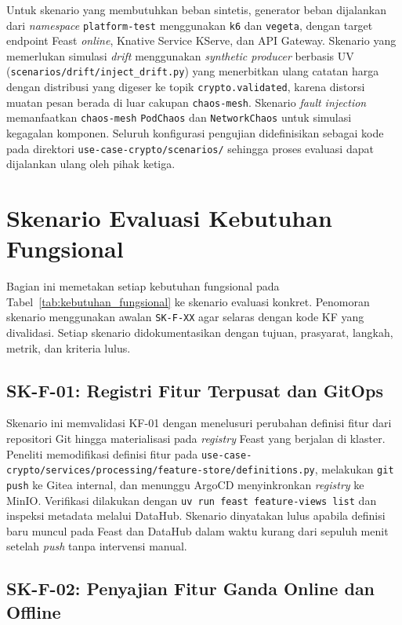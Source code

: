 Untuk skenario yang membutuhkan beban sintetis, generator beban dijalankan dari \textit{namespace} \texttt{platform-test} menggunakan \texttt{k6} dan \texttt{vegeta}, dengan target endpoint Feast \textit{online}, Knative Service KServe, dan API Gateway. Skenario yang memerlukan simulasi \textit{drift} menggunakan \textit{synthetic producer} berbasis UV (\texttt{scenarios/drift/inject\_drift.py}) yang menerbitkan ulang catatan harga dengan distribusi yang digeser ke topik \texttt{crypto.validated}, karena distorsi muatan pesan berada di luar cakupan \texttt{chaos-mesh}. Skenario \textit{fault injection} memanfaatkan \texttt{chaos-mesh} \texttt{PodChaos} dan \texttt{NetworkChaos} untuk simulasi kegagalan komponen. Seluruh konfigurasi pengujian didefinisikan sebagai kode pada direktori \texttt{use-case-crypto/scenarios/} sehingga proses evaluasi dapat dijalankan ulang oleh pihak ketiga.

\section{Skenario Evaluasi Kebutuhan Fungsional}
\label{sec:skenario_kf}

Bagian ini memetakan setiap kebutuhan fungsional pada Tabel~\ref{tab:kebutuhan_fungsional} ke skenario evaluasi konkret. Penomoran skenario menggunakan awalan \texttt{SK-F-XX} agar selaras dengan kode KF yang divalidasi. Setiap skenario didokumentasikan dengan tujuan, prasyarat, langkah, metrik, dan kriteria lulus.

\subsection{SK-F-01: Registri Fitur Terpusat dan GitOps}

Skenario ini memvalidasi KF-01 dengan menelusuri perubahan definisi fitur dari repositori Git hingga materialisasi pada \textit{registry} Feast yang berjalan di klaster. Peneliti memodifikasi definisi fitur pada \texttt{use-case-crypto/services/processing/feature-store/definitions.py}, melakukan \texttt{git push} ke Gitea internal, dan menunggu ArgoCD menyinkronkan \textit{registry} ke MinIO. Verifikasi dilakukan dengan \texttt{uv run feast feature-views list} dan inspeksi metadata melalui DataHub. Skenario dinyatakan lulus apabila definisi baru muncul pada Feast dan DataHub dalam waktu kurang dari sepuluh menit setelah \textit{push} tanpa intervensi manual.

\subsection{SK-F-02: Penyajian Fitur Ganda Online dan Offline}

